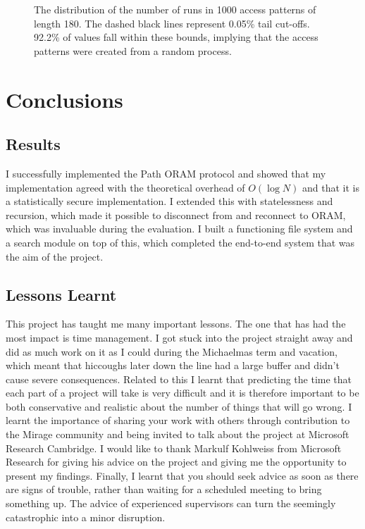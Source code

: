\documentclass[12pt,a4paper,twoside,openright]{report}
\begin{document}
\begin{figure}
    \centering
    
    \caption{The distribution of the number of runs in 1000 access patterns of length 180. The dashed black lines represent 0.05\% tail cut-offs. 92.2\% of values fall within these bounds, implying that the access patterns were created from a random process.}
    \label{fig:runsTestPlot}
\end{figure}

\chapter{Conclusions}

\section{Results}

I successfully implemented the Path ORAM protocol and showed that my implementation agreed with the theoretical overhead of $O(\log N)$ and that it is a statistically secure implementation. I extended this with statelessness and recursion, which made it possible to disconnect from and reconnect to ORAM, which was invaluable during the evaluation. I built a functioning file system and a search module on top of this, which completed the end-to-end system that was the aim of the project.

\section{Lessons Learnt}

This project has taught me many important lessons. The one that has had the most impact is time management. I got stuck into the project straight away and did as much work on it as I could during the Michaelmas term and vacation, which meant that hiccoughs later down the line had a large buffer and didn't cause severe consequences. Related to this I learnt that predicting the time that each part of a project will take is very difficult and it is therefore important to be both conservative and realistic about the number of things that will go wrong. I learnt the importance of sharing your work with others through contribution to the Mirage community and being invited to talk about the project at Microsoft Research Cambridge. I would like to thank Markulf Kohlweiss from Microsoft Research for giving his advice on the project and giving me the opportunity to present my findings. Finally, I learnt that you should seek advice as soon as there are signs of trouble, rather than waiting for a scheduled meeting to bring something up. The advice of experienced supervisors can turn the seemingly catastrophic into a minor disruption.
\end{document}
